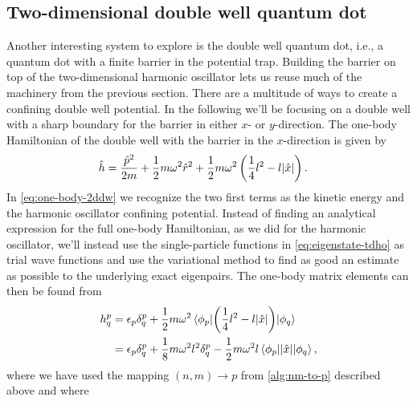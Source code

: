     \subsection{Two-dimensional double well quantum dot}
        \label{subsec:tddw}
        Another interesting system to explore is the double well quantum dot,
        i.e., a quantum dot with a finite barrier in the potential trap.
        Building the barrier on top of the two-dimensional harmonic oscillator
        lets us reuse much of the machinery from the previous section.
        There are a multitude of ways to create a confining double well
        potential.
        In the following we'll be focusing on a double well with a sharp
        boundary for the barrier in either $x$- or $y$-direction.
        The one-body Hamiltonian of the double well with the barrier in the
        $x$-direction is given by
        \begin{align}
            \onehamil
            &=
            \frac{\momentum^2}{2m}
            + \half m \omega^2 \position[r]^2
            + \half m \omega^2 \para{
                \frac{1}{4} l^2 - l\abs{\position}
            }.
            \label{eq:one-body-2ddw}
        \end{align}
        In \autoref{eq:one-body-2ddw} we recognize the two first terms as the
        kinetic energy and the harmonic oscillator confining potential.
        Instead of finding an analytical expression for the full one-body
        Hamiltonian, as we did for the harmonic oscillator, we'll instead use
        the single-particle functions in \autoref{eq:eigenstate-tdho} as trial
        wave functions and use the variational method to find as good an
        estimate as possible to the underlying exact eigenpairs.
        The one-body matrix elements can then be found from
        \begin{align}
            h^{p}_{q}
            &= \epsilon_{p}\delta^{p}_{q}
            + \frac{1}{2} m \omega^2\mel*{\phi_p}{
                \left( 
                    \frac{1}{4} l^2 - l \abs{\hat{x}}
                 \right)
            }{\phi_q}
            \\
            &= \epsilon_{p}\delta^{p}_{q}
            + \frac{1}{8} m \omega^2 l^2 \delta^{p}_{q}
            - \frac{1}{2} m \omega^2 l \mel*{\phi_p}{\abs{\hat{x}}}{\phi_q},
        \end{align}
        where we have used the mapping $(n, m) \to p$ from
        \autoref{alg:nm-to-p} described above and where

